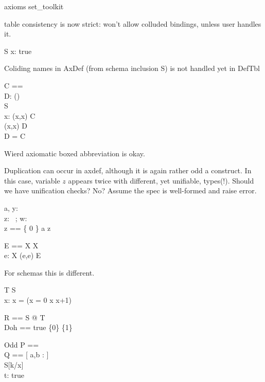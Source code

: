 \documentclass{article}
\begin{document}
\begin{zsection}
\SECTION axioms \parents set\_toolkit
\end{zsection}

table consistency is now strict: won't allow colluded bindings, unless user handles it.
\begin{schema}{S}
   x: \nat %
\where
   true
\end{schema}

Coliding names in AxDef (from schema inclusion S) is not handled yet in DefTbl
\begin{axdef}
   C == \nat \cross \nat \\
   D: \power(\nat \cross \nat) \\
   S \\
   x: \nat
\where
   (x,x) \in C \\
   (x,x) \in D \\
   D = C
\end{axdef}
Wierd axiomatic boxed abbreviation is okay.

Duplication can occur in axdef, although it is again rather odd a construct.
In this case, variable $z$ appears twice with different, yet unifiable, types(!).
Should we have unification checks? No? Assume the spec is well-formed and raise error.
\begin{axdef}
   a, y: \nat \\
   z: \power~\nat; w: \nat \cross \nat \\
   z == \{ 0 \}
\where
   a \in z
\end{axdef}

\begin{gendef}[X]
   E == X \cross X \\
   e: X
\where
   (e,e) \in E
\end{gendef}

For schemas this is different.
\begin{schema}{T}
   S \\
   x: \nat
 \where
    x = (\IF x = 0 \THEN x \ELSE x+1)
\end{schema}

\begin{zed}
   R == \forall S @ T
   \\
   Doh == \IF true \THEN \{0\} \ELSE \{1\}
\end{zed}

\begin{schema}{Odd}
   P == \nat \cross \nat \\
   Q == [ a,b : \nat ] \\
   S[k/x] \\
   t: \nat
\where 
   true
\end{schema}
\end{document}
